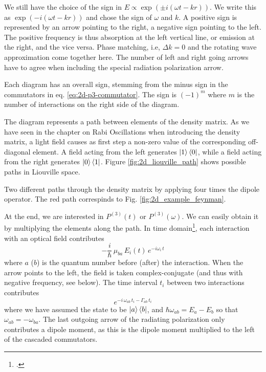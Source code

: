 We still have the choice of the sign in $E \propto \exp( \pm i (\omega t - k r) )$. We write this as  $\exp(- i (\omega t - k r) )$ and chose the sign of $\omega$ and $k$.
A positive sign is represented by an arrow pointing to the right, a negative sign pointing to the left. The positive frequency is thus absorption at the left vertical line, or emission at the right, and the vice versa. Phase matching, i.e, $\Delta k = 0$ and the rotating wave approximation come together here. The number of left and right going arrows have to agree when including the special radiation polarization arrow.

Each diagram has an overall sign, stemming from the minus sign in the commutators in eq. \ref{eq:2d-p3-commutator}. The sign is $(-1)^m$ where $m$ is the number of interactions on the right side of the diagram.

The diagram represents a path between elements of the density matrix. As we have seen in the chapter on Rabi Oscillations when introducing the density matrix, a light field causes as first step a non-zero value of the corresponding off-diagonal element. A field acting from the left generates $\ket{1} \bra{0}$, while a field acting from the right generates $\ket{0} \bra{1}$. Figure \ref{fig:2d_liouville_path} shows possible paths in Liouville space.

\begin{marginfigure}

\caption{
Two different paths  through the density matrix by applying four times the dipole operator. The red path correspinds to Fig. \ref{fig:2d_example_feynman}.}
\label{fig:2d_liouville_path}
\end{marginfigure}

At the end, we are interested in $P^{(3)}(t)$ or $P^{(3)}(\omega)$. We can easily obtain it by multiplying the elements along the path. In time domain\footcite{Mukamel1995,HammZanni2011,Hamm-dummies}, each interaction with an optical field contributes
\begin{equation}
 - \frac{i}{\hbar} \, \mu_{ba} \, E_i(t)  \, e^{-i \omega_i \, t}
\end{equation}
where $a$ ($b$) is the quantum number before (after) the interaction. When the arrow points to the left, the field is taken complex-conjugate (and thus with negative frequency, see below). The time interval $t_i$ between two interactions contributes 
%
\begin{equation}
 e^{-i \, \omega_{ab} \, t_i - \Gamma_{ab} \, t_i}
\end{equation}
%
where we have assumed the state to be $\ket{a} \bra{b}$, and 
$\hbar \omega_{ab} = E_a - E_b$ so that $\omega_{ab}  = - \omega_{ba} $. The last outgoing arrow of the radiating polarization only contributes a dipole moment, as this is the dipole moment multiplied to the left of the cascaded commutators.

